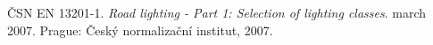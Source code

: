 \begin{thebibliography}{1}

ČSN EN 13201-1. \textit{Road lighting - Part 1: Selection of lighting classes}. march 2007. Prague: Český normalizační institut, 2007. 

\end{thebibliography}